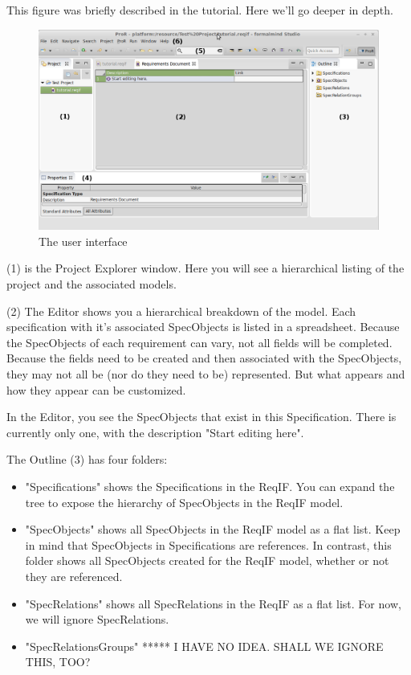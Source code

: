 This figure was briefly described in the tutorial.  Here we'll go deeper in depth.

\begin{figure}[h!]
  \centering
  \includegraphics[width=\linewidth]{../rmf-images/Screenshot_intro.png}
  \caption{The \pror{} user interface}
  \label{fig:user_interface_overview}
\end{figure}

(1) is the Project Explorer window.  Here you will see a hierarchical listing of the project and the associated models.

(2) The Editor shows you a hierarchical breakdown of the model.  Each specification with it's associated SpecObjects is listed in a spreadsheet.  Because the SpecObjects of each requirement can vary, not all fields will be completed.  Because the fields need to  be created and then associated with the SpecObjects, they may not all be (nor do they need to be) represented.  But what appears and how they appear can be customized.

In the Editor, you see the SpecObjects that exist in this Specification.
There is currently only one, with the description "Start editing here".

The Outline (3) has four folders:

\begin{itemize}

\item
  "Specifications" shows the Specifications in the ReqIF.  You can
  expand the tree to expose the hierarchy of SpecObjects in the
  ReqIF model.
\item
  "SpecObjects" shows all SpecObjects in the ReqIF model as a flat list.
  Keep in mind that SpecObjects in Specifications are references.  In
  contrast, this folder shows all SpecObjects created for the ReqIF model, whether or not they are referenced.
\item
  "SpecRelations" shows all SpecRelations in the ReqIF as a flat list.
  For now, we will ignore SpecRelations.
\item
  "SpecRelationsGroups" ***** I HAVE NO IDEA.  SHALL WE IGNORE THIS, TOO?
\end{itemize}

